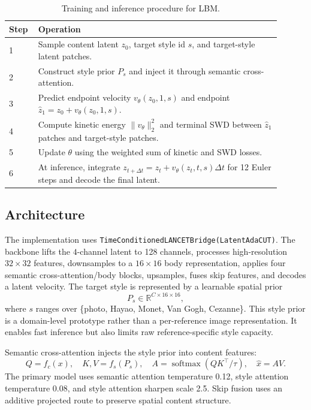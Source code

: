 ﻿\documentclass{article}
\begin{document}
\begin{table}[t]
\centering
\caption{Training and inference procedure for LBM.}
\label{tab:algorithm}
\begin{tabular}{p{0.08\linewidth}p{0.82\linewidth}}
\toprule
Step & Operation \\
\midrule
1 & Sample content latent $z_0$, target style id $s$, and target-style latent patches. \\
2 & Construct style prior $P_s$ and inject it through semantic cross-attention. \\
3 & Predict endpoint velocity $v_\theta(z_0,1,s)$ and endpoint $\hat{z}_1=z_0+v_\theta(z_0,1,s)$. \\
4 & Compute kinetic energy $\|v_\theta\|_2^2$ and terminal SWD between $\hat{z}_1$ patches and target-style patches. \\
5 & Update $\theta$ using the weighted sum of kinetic and SWD losses. \\
6 & At inference, integrate $z_{t+\Delta t}=z_t+v_\theta(z_t,t,s)\Delta t$ for 12 Euler steps and decode the final latent. \\
\bottomrule
\end{tabular}
\end{table}

\subsection{Architecture}
The implementation uses \texttt{TimeConditionedLANCETBridge(LatentAdaCUT)}. The backbone lifts the $4$-channel latent to 128 channels, processes high-resolution $32 \times 32$ features, downsamples to a $16 \times 16$ body representation, applies four semantic cross-attention/body blocks, upsamples, fuses skip features, and decodes a latent velocity. The target style is represented by a learnable spatial prior
\begin{equation}
    P_s \in \mathbb{R}^{C \times 16 \times 16},
\end{equation}
where $s$ ranges over \{photo, Hayao, Monet, Van Gogh, Cezanne\}. This style prior is a domain-level prototype rather than a per-reference image representation. It enables fast inference but also limits raw reference-specific style capacity.

Semantic cross-attention injects the style prior into content features:
\begin{equation}
    Q=f_c(x), \quad K,V=f_s(P_s), \quad A=\operatorname{softmax}(QK^\top/\tau), \quad \hat{x}=AV .
\end{equation}
The primary model uses semantic attention temperature 0.12, style attention temperature 0.08, and style attention sharpen scale 2.5. Skip fusion uses an additive projected route to preserve spatial content structure.
\end{document}
